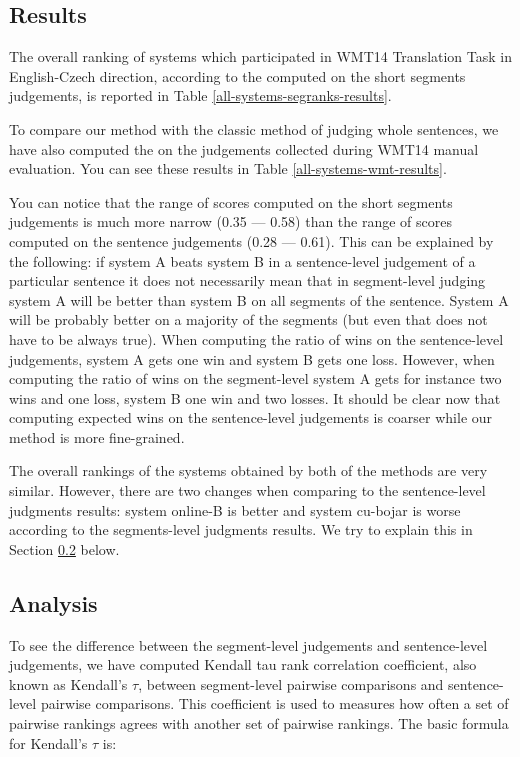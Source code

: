 \subsection{Results}

The overall ranking of systems which participated in WMT14 Translation Task in
English-Czech direction, according to the  computed on the short segments judgements, is reported in Table
\ref{all-systems-segranks-results}.

To compare our method with the classic method of judging whole sentences, we
have also computed the  on the judgements
collected during WMT14 manual evaluation. You can see these results in
Table \ref{all-systems-wmt-results}.

You can notice that the range of scores computed on the short segments
judgements is much more narrow (0.35 --- 0.58) than the range of scores computed
on the sentence judgements (0.28 --- 0.61). This can be explained by the
following: if system A beats system B in a sentence-level judgement of a
particular sentence it does not necessarily mean that in segment-level judging
system A will be better than system B on all segments of the sentence. System A
will be probably better on a majority of the segments (but even that does not
have to be always true). When computing the ratio of wins on the sentence-level
judgements, system A gets one win and system B gets one loss. However, when
computing the ratio of wins on the segment-level system A gets for instance two
wins and one loss, system B one win and two losses. It should be clear now that
computing expected wins on the sentence-level judgements is coarser while our
method is more fine-grained.  

The overall rankings of the systems obtained by both of the methods are very
similar. However, there are two changes when comparing to the sentence-level
judgments results: system online-B is better and system cu-bojar is worse
according to the segments-level judgments results. We try to explain this in 
Section \ref{analysis} below.

\subsection{Analysis}
\label{analysis}

To see the difference between the segment-level judgements and sentence-level
judgements, we have computed Kendall tau rank correlation coefficient, also
known as Kendall's $\tau$, between segment-level pairwise comparisons and
sentence-level pairwise comparisons. This coefficient is used to measures how
often a set of pairwise rankings agrees with another set of pairwise rankings.
The basic formula for Kendall's $\tau$ is:

